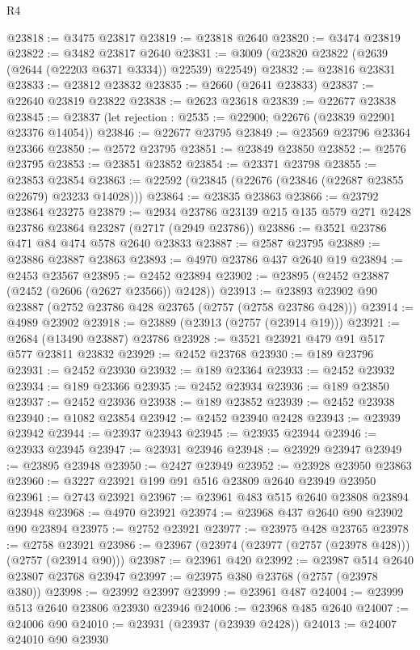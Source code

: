 \begin{lexlean}{R4}
\begin{coremodule}
@23818 := @3475 @23817
@23819 := @23818 @2640
@23820 := @3474 @23819
@23822 := @3482 @23817 @2640
@23831 := @3009 (@23820 @23822 (@2639 (@2644 (@22203 @6371 @3334)) @22539) @22549)
@23832 := @23816 @23831
@23833 := @23812 @23832
@23835 := @2660 (@2641 @23833)
@23837 := @22640 @23819 @23822
@23838 := @2623 @23618
@23839 := @22677 @23838
@23845 := @23837 (let rejection : @2535 := @22900; @22676 (@23839 @22901 @23376 @14054))
@23846 := @22677 @23795
@23849 := @23569 @23796 @23364 @23366
@23850 := @2572 @23795
@23851 := @23849 @23850
@23852 := @2576 @23795
@23853 := @23851 @23852
@23854 := @23371 @23798
@23855 := @23853 @23854
@23863 := @22592 (@23845 (@22676 (@23846 (@22687 @23855 @22679) @23233 @14028)))
@23864 := @23835 @23863
@23866 := @23792 @23864 @23275
@23879 := @2934 @23786 @23139 @215 @135 @579 @271 @2428 @23786 @23864 @23287 (@2717 (@2949 @23786))
@23886 := @3521 @23786 @471 @84 @474 @578 @2640 @23833
@23887 := @2587 @23795
@23889 := @23886 @23887 @23863
@23893 := @4970 @23786 @437 @2640 @19
@23894 := @2453 @23567
@23895 := @2452 @23894
@23902 := @23895 (@2452 @23887 (@2452 (@2606 (@2627 @23566)) @2428))
@23913 := @23893 @23902 @90 @23887 (@2752 @23786 @428 @23765 (@2757 (@2758 @23786 @428)))
@23914 := @4989 @23902
@23918 := @23889 (@23913 (@2757 (@23914 @19)))
@23921 := @2684 (@13490 @23887) @23786
@23928 := @3521 @23921 @479 @91 @517 @577 @23811 @23832
@23929 := @2452 @23768
@23930 := @189 @23796
@23931 := @2452 @23930
@23932 := @189 @23364
@23933 := @2452 @23932
@23934 := @189 @23366
@23935 := @2452 @23934
@23936 := @189 @23850
@23937 := @2452 @23936
@23938 := @189 @23852
@23939 := @2452 @23938
@23940 := @1082 @23854
@23942 := @2452 @23940 @2428
@23943 := @23939 @23942
@23944 := @23937 @23943
@23945 := @23935 @23944
@23946 := @23933 @23945
@23947 := @23931 @23946
@23948 := @23929 @23947
@23949 := @23895 @23948
@23950 := @2427 @23949
@23952 := @23928 @23950 @23863
@23960 := @3227 @23921 @199 @91 @516 @23809 @2640 @23949 @23950
@23961 := @2743 @23921
@23967 := @23961 @483 @515 @2640 @23808 @23894 @23948
@23968 := @4970 @23921
@23974 := @23968 @437 @2640 @90 @23902 @90 @23894
@23975 := @2752 @23921
@23977 := @23975 @428 @23765
@23978 := @2758 @23921
@23986 := @23967 (@23974 (@23977 (@2757 (@23978 @428))) (@2757 (@23914 @90)))
@23987 := @23961 @420
@23992 := @23987 @514 @2640 @23807 @23768 @23947
@23997 := @23975 @380 @23768 (@2757 (@23978 @380))
@23998 := @23992 @23997
@23999 := @23961 @487
@24004 := @23999 @513 @2640 @23806 @23930 @23946
@24006 := @23968 @485 @2640
@24007 := @24006 @90
@24010 := @23931 (@23937 (@23939 @2428))
@24013 := @24007 @24010 @90 @23930

\end{coremodule}
\end{lexlean}
